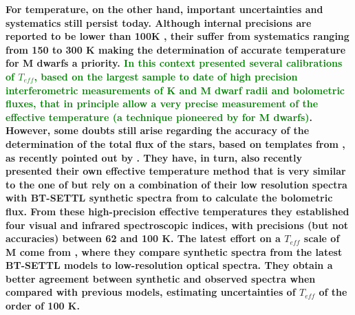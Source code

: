 \documentclass{aa}
\begin{document}
\textbf{For temperature, on the other hand, important uncertainties and systematics still persist today. Although internal precisions are reported to be lower than 100K \citep[e.g.][]{Casagrande-2008,Rojas-Ayala-2012,Boyajian-2012}, their suffer from systematics ranging from 150 to 300 K making the determination of accurate temperature for M dwarfs a priority. \textcolor{green}{In this context \citet{Boyajian-2012} presented several calibrations of $T_{eff}$, based on the largest sample to date of high precision interferometric measurements of K and M dwarf radii and bolometric fluxes, that in principle allow a very precise measurement of the effective temperature (a technique pioneered by \citet{Segransan-2003} for M dwarfs)}. However, some doubts still arise regarding the accuracy of the determination of the total flux of the stars, based on templates from \citet{Pickles-1998}, as recently pointed out by \citet[][]{Mann-2013b}. They have, in turn, also recently presented their own effective temperature method that is very similar to the one of \citet{Boyajian-2012} but rely on a combination of their low resolution spectra with BT-SETTL synthetic spectra from \citet{Allard-2011} to calculate the bolometric flux. From these high-precision effective temperatures they established four visual and infrared spectroscopic indices, with precisions (but not accuracies) between 62 and 100 K. The latest effort on a $T_{eff}$ scale of M come from \citet{Rajpurohit-2013a}, where they compare synthetic spectra from the latest BT-SETTL models \citep{Allard-2012} to low-resolution optical spectra. They obtain a better agreement between synthetic and observed spectra when compared with previous models, estimating uncertainties of $T_{eff}$ of the order of 100 K. 
}




\end{document}
